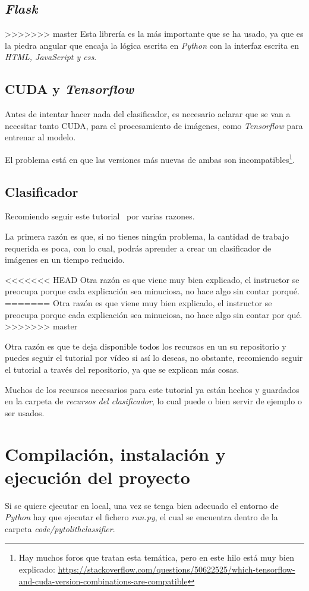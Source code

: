\subsection{\textit{Flask}}
>>>>>>> master
Esta librería es la más importante que se ha usado, ya que es la piedra angular que encaja la lógica escrita en \textit{Python} con la interfaz escrita en \textit{HTML, JavaScript y css}.

\subsection{CUDA y \textit{Tensorflow}}
Antes de intentar hacer nada del clasificador, es necesario aclarar que se van a necesitar tanto CUDA, para el procesamiento de imágenes, como \textit{Tensorflow} para entrenar al modelo.

El problema está en que las versiones más nuevas de ambas son incompatibles\footnote{Hay muchos foros que tratan esta temática, pero en este hilo está muy bien explicado: \url{https://stackoverflow.com/questions/50622525/which-tensorflow-and-cuda-version-combinations-are-compatible}}.

\subsection{Clasificador}
Recomiendo seguir este tutorial~\cite{git} por varias razones.

La primera razón es que, si no tienes ningún problema, la cantidad de trabajo requerida es poca, con lo cual, podrás aprender a crear un clasificador de imágenes en un tiempo reducido.

<<<<<<< HEAD
Otra razón es que viene muy bien explicado, el instructor se preocupa porque cada explicación sea minuciosa, no hace algo sin contar porqué.
=======
Otra razón es que viene muy bien explicado, el instructor se preocupa porque cada explicación sea minuciosa, no hace algo sin contar por qué.
>>>>>>> master

Otra razón es que te deja disponible todos los recursos en un su repositorio y puedes seguir el tutorial por vídeo si así lo deseas, no obstante, recomiendo seguir el tutorial a través del repositorio, ya que se explican más cosas.

Muchos de los recursos necesarios para este tutorial ya están hechos y guardados en la carpeta de \textit{recursos del clasificador}, lo cual puede o bien servir de ejemplo o ser usados.
\section{Compilación, instalación y ejecución del proyecto}
Si se quiere ejecutar en local, una vez se tenga bien adecuado el entorno de \textit{Python} hay que ejecutar el fichero \textit{run.py}, el cual se encuentra dentro de la carpeta \textit{code/pytolithclassifier}.

